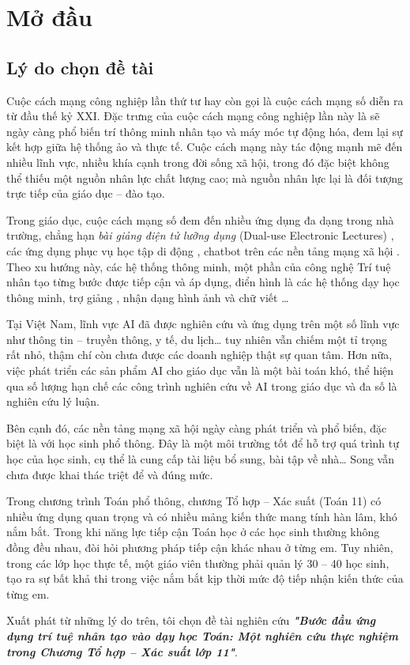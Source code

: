 \chapter*{Mở đầu}

\renewcommand*{\thesection}{\arabic{section}}
\renewcommand*{\thesubsection}{\alph{subsection}}

\section{Lý do chọn đề tài}
Cuộc cách mạng công nghiệp lần thứ tư hay còn gọi là cuộc cách mạng số diễn ra từ đầu thế kỷ XXI. Đặc trưng của cuộc cách mạng công nghiệp lần này là sẽ ngày càng phổ biến trí thông minh nhân tạo và máy móc tự động hóa, đem lại sự kết hợp giữa hệ thống ảo và thực tế. Cuộc cách mạng này tác động mạnh mẽ đến nhiều lĩnh vực, nhiều khía cạnh trong đời sống xã hội, trong đó đặc biệt không thể thiếu một nguồn nhân lực chất lượng cao; mà nguồn nhân lực lại là đối tượng trực tiếp của giáo dục – đào tạo.\par
Trong giáo dục, cuộc cách mạng số đem đến nhiều ứng dụng đa dạng trong nhà trường, chẳng hạn \textit{bài giảng điện tử lưỡng dụng} (Dual-use Electronic Lectures) \parencite{tuan2020using}, các ứng dụng phục vụ học tập di động \parencite{tuan2020mobile}, chatbot trên các nền tảng mạng xã hội \parencite{hsu2012mobile,fang2019development,hoang2011ung}. Theo xu hướng này, các hệ thống thông minh, một phần của công nghệ Trí tuệ nhân tạo từng bước được tiếp cận và áp dụng, điển hình là các hệ thống dạy học thông minh, trợ giảng \parencite{goel2016jill}, nhận dạng hình ảnh và chữ viết \parencite{szeto2020deep}…\par
Tại Việt Nam, lĩnh vực AI đã được nghiên cứu và ứng dụng trên một số lĩnh vực như thông tin – truyền thông, y tế, du lịch… tuy nhiên vẫn chiếm một tỉ trọng rất nhỏ, thậm chí còn chưa được các doanh nghiệp thật sự quan tâm. Hơn nữa, việc phát triển các sản phẩm AI cho giáo dục vẫn là một bài toán khó, thể hiện qua số lượng hạn chế các công trình nghiên cứu về AI trong giáo dục và đa số là nghiên cứu lý luận.\par
Bên cạnh đó, các nền tảng mạng xã hội ngày càng phát triển và phổ biến, đặc biệt là với học sinh phổ thông. Đây là một môi trường tốt để hỗ trợ quá trình tự học của học sinh, cụ thể là cung cấp tài liệu bổ sung, bài tập về nhà… Song vẫn chưa được khai thác triệt để và đúng mức.\par
Trong chương trình Toán phổ thông, chương Tổ hợp – Xác suất (Toán 11) có nhiều ứng dụng quan trọng và có nhiều mảng kiến thức mang tính hàn lâm, khó nắm bắt. Trong khi năng lực tiếp cận Toán học ở các học sinh thường không đồng đều nhau, đòi hỏi phương pháp tiếp cận khác nhau ở từng em. Tuy nhiên, trong các lớp học thực tế, một giáo viên thường phải quản lý 30 – 40 học sinh, tạo ra sự bất khả thi trong việc nắm bắt kịp thời mức độ tiếp nhận kiến thức của từng em.\par
Xuất phát từ những lý do trên, tôi chọn đề tài nghiên cứu \textbf{\textit{"Bước đầu ứng dụng trí tuệ nhân tạo vào dạy học Toán: Một nghiên cứu thực nghiệm trong Chương Tổ hợp – Xác suất lớp 11"}}.\par

